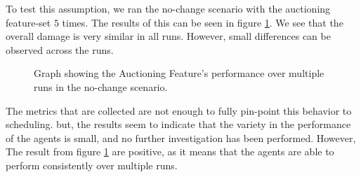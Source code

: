 To test this assumption, we ran the no-change scenario with the auctioning feature-set $5$ times. The results of this can be seen in figure \ref{fig:multi-run-no-change}. We see that the overall damage is very similar in all runs. However, small differences can be observed across the runs.

\begin{figure}[H]
    \centering
        
    \caption{Graph showing the Auctioning Feature's performance over multiple runs in the no-change scenario.}
    \label{fig:multi-run-no-change}
\end{figure}

The metrics that are collected are not enough to fully pin-point this behavior to scheduling. but, the results seem to indicate that the variety in the performance of the agents is small, and no further investigation has been performed. However, The result from figure \ref{fig:multi-run-no-change} are positive, as it means that the agents are able to perform consistently over multiple runs.

